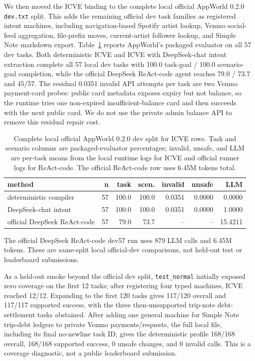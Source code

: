 \documentclass[11pt]{article}
\newcommand{\icve}{ICVE\xspace}
\begin{document}
We then moved the ICVE binding to the complete local official AppWorld 0.2.0
\texttt{dev.txt} split. This adds the remaining official dev task families as registered
intent machines, including navigation-based Spotify artist lookup, Venmo social-feed
aggregation, file-prefix moves, current-artist follower lookup, and Simple Note markdown
export. Table~\ref{tab:appworld-dev57} reports AppWorld's packaged evaluator on all 57
dev tasks. Both deterministic \icve and \icve with DeepSeek-chat intent extraction
complete all 57 local dev tasks with 100.0 task-goal / 100.0 scenario-goal completion,
while the official DeepSeek ReAct-code agent reaches 79.0 / 73.7 and 45/57. The residual
0.0351 invalid API attempts per task are two Venmo payment-card probes: public card
metadata exposes expiry but not balance, so the runtime tries one non-expired
insufficient-balance card and then succeeds with the next public card. We do not use the
private admin balance API to remove this residual repair cost.

\begin{table}[t]
\centering
\scriptsize
\setlength{\tabcolsep}{4pt}
\begin{tabular}{lrrrrrr}
\toprule
method & n & task & scen. & invalid & unsafe & LLM \\
\midrule
deterministic compiler & 57 & 100.0 & 100.0 & 0.0351 & 0.0000 & 0.0000 \\
DeepSeek-chat intent & 57 & 100.0 & 100.0 & 0.0351 & 0.0000 & 1.0000 \\
official DeepSeek ReAct-code & 57 & 79.0 & 73.7 & -- & -- & 15.4211 \\
\bottomrule
\end{tabular}
\caption{Complete local official AppWorld 0.2.0 dev split for ICVE rows. Task and
scenario columns are packaged-evaluator percentages; invalid, unsafe, and LLM
are per-task means from the local runtime logs for ICVE and official runner logs for
ReAct-code. The official ReAct-code row uses 6.45M tokens total.}
\label{tab:appworld-dev57}
\end{table}

The official DeepSeek ReAct-code dev57 run uses 879 LLM calls and 6.45M tokens. These are
same-split local official-dev comparisons, not held-out test or leaderboard submissions.

As a held-out smoke beyond the official dev split, \texttt{test\_normal} initially
exposed zero coverage on the first 12 tasks; after registering four typed machines, ICVE
reached 12/12. Expanding to the first 120 tasks gives 117/120 overall and 117/117
supported success, with the three then-unsupported trip-note debt-settlement tasks
abstained. After adding one general machine for Simple Note trip-debt ledgers to private
Venmo payments/requests, the full local file, including its final no-newline task ID,
gives the deterministic profile 168/168 overall, 168/168 supported success, 0 unsafe
changes, and 0 invalid calls. This is a coverage diagnostic, not a public leaderboard
submission.
\end{document}
